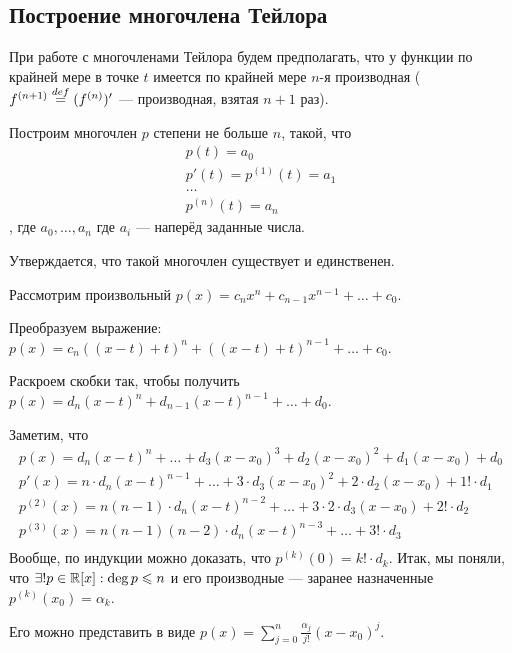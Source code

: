 \documentclass[a4paper]{report}
\begin{document}
    \subsection{Построение многочлена Тейлора}
    При работе с многочленами Тейлора будем предполагать, что у функции по крайней мере в точке $t$ имеется по крайней мере $n$-я производная ($f^{(n + 1)} \overset{def}{=} (f^{(n)})'$ --- производная, взятая $n + 1$ раз).

    Построим многочлен $p$ степени не больше $n$, такой, что \begin{gather*}
                                                                 p(t) = a_0\\ p'(t) = p^{(1)}(t) = a_1\\ \dots\\ p^{(n)}(t) = a_n
    \end{gather*}, где $a_0, \dots, a_n$  где $a_i$ --- наперёд заданные числа.

    Утверждается, что такой многочлен существует и единственен.

    Рассмотрим произвольный $p(x) = c_n x^n + c_{n - 1} x^{n - 1} + \dots + c_0$.

    Преобразуем выражение: $p(x) = c_n ((x - t) + t)^n + ((x - t) + t)^{n - 1} + \dots + c_0$.

    Раскроем скобки так, чтобы получить $p(x) = d_n(x - t)^n + d_{n - 1}(x - t)^{n - 1} + \dots + d_0$.

    Заметим, что
    \begin{gather*}
        p(x) = d_n(x - t)^n + \dots + d_3(x - x_0)^3 + d_2(x - x_0)^2 + d_1(x - x_0) + d_0\\
        p'(x) = n \cdot d_n(x - t)^{n-1} + \dots + 3 \cdot d_3(x - x_0)^2 + 2 \cdot d_2(x - x_0) + 1! \cdot d_1\\
        p^{(2)}(x) = n(n - 1) \cdot d_n(x - t)^{n-2} + \dots + 3 \cdot 2 \cdot d_3(x - x_0) + 2! \cdot d_2\\
        p^{(3)}(x) = n(n - 1)(n - 2) \cdot d_n(x - t)^{n-3} + \dots + 3! \cdot d_3\\
    \end{gather*}
    Вообще, по индукции можно доказать, что $p^{(k)}(0) = k! \cdot d_k$.
    Итак, мы поняли, что $\exists! p \in \mathbb{R}[x]: \deg p \leqslant n$ и его производные --- заранее назначенные $p^{(k)}(x_0) = \alpha_k$.

    Его можно представить в виде $p(x) = \sum\limits_{j = 0}^n \frac{\alpha_j}{j!}(x - x_0)^j$.
\end{document}
